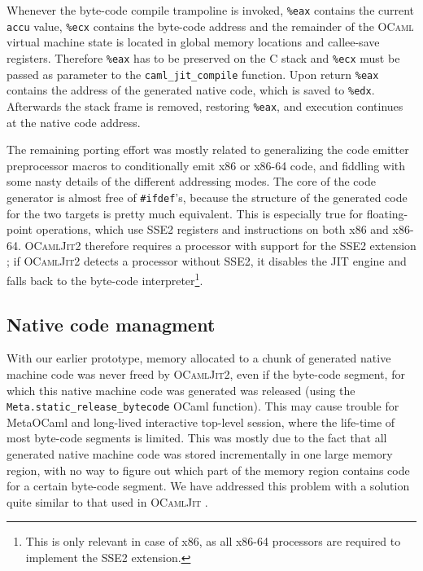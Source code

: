 \documentclass[12pt,a4paper,final]{article}
\begin{document}
Whenever the byte-code compile trampoline is invoked, \texttt{\%eax} contains
the current \texttt{accu} value, \texttt{\%ecx} contains the byte-code address
and the remainder of the \textsc{OCaml} virtual machine state is located in
global memory locations and callee-save registers. Therefore \texttt{\%eax}
has to be preserved on the C stack and \texttt{\%ecx} must be passed as parameter
to the \texttt{caml\_jit\_compile} function. Upon return \texttt{\%eax} contains
the address of the generated native code, which is saved to \texttt{\%edx}.
Afterwards the stack frame is removed, restoring \texttt{\%eax}, and execution
continues at the native code address.

The remaining porting effort was mostly related to generalizing the code
emitter preprocessor macros to conditionally emit x86 or x86-64 code, and fiddling with
some nasty details of the different addressing modes. The core of the code
generator is almost free of \texttt{\#ifdef}'s, because the structure of the generated code
for the two targets is pretty much equivalent. This is especially true for
floating-point operations, which use SSE2 registers and instructions on
both x86 and x86-64. \textsc{OCamlJit2} therefore requires a processor
with support for the SSE2 extension \cite{Amd09Vol1,Intel10Vol1}; if \textsc{OCamlJit2} detects a
processor without SSE2, it disables the JIT engine and falls back to
the byte-code interpreter\footnote{This is only relevant in case of x86,
as all x86-64 processors are required to implement the SSE2 extension.}.

\subsection{Native code managment} \label{subsection:Native_code_management}

With our earlier prototype, memory allocated to a chunk of generated native machine code was never freed
by \textsc{OCamlJit2}, even if the byte-code segment, for which this native machine code
was generated was released (using the \texttt{Meta.static\_release\_bytecode} OCaml
function). This may cause trouble for MetaOCaml \cite{Taha06} and long-lived interactive
top-level session, where the life-time of most byte-code segments is limited.
This was mostly due to the fact that all generated native machine code was stored 
incrementally in one large memory region, with no way to figure out which part of
the memory region contains code for a certain byte-code segment. We have addressed
this problem with a solution quite similar to that used in \textsc{OCamlJit}
\cite{Starynkevitch04}.
\end{document}
